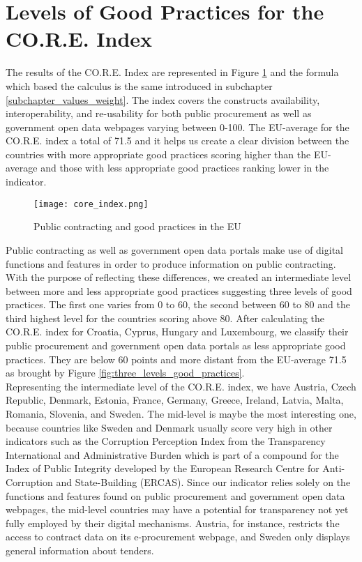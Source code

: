 \documentclass[a4paper, twoside]{report}
\begin{document}
\section{Levels of Good Practices for the CO.R.E. Index}
\label{core_index_eu}

The results of the CO.R.E. Index are represented in Figure \ref{fig:core_index} and the formula which based the calculus is the same introduced in subchapter \ref{subchapter_values_weight}. The index covers the constructs availability, interoperability, and re-usability for both public procurement as well as government open data webpages varying between 0-100. The EU-average for the CO.R.E. index a total of 71.5 and it helps us create a clear division between the countries with more appropriate good practices scoring higher than the EU-average and those with less appropriate good practices ranking lower in the indicator.\\

\begin{figure}[H]
\centering
	\caption{Public contracting and good practices in the EU}
	\texttt{[image: core\_index.png]}
	\label{fig:core_index}
\end{figure}


Public contracting as well as government open data portals make use of digital functions and features in order to produce information on public contracting. With the purpose of reflecting these differences, we created an intermediate level between more and less appropriate good practices suggesting three levels of good practices. The first one varies from 0 to 60, the second between 60 to 80 and the third highest level for the countries scoring above 80. After calculating the CO.R.E. index for Croatia, Cyprus, Hungary and Luxembourg, we classify their public procurement and government open data portals as less appropriate good practices. They are below 60 points and more distant from the EU-average 71.5 as brought by Figure \ref{fig:three_levels_good_practices}.\\

Representing the intermediate level of the CO.R.E. index, we have Austria, Czech Republic, Denmark, Estonia, France, Germany, Greece, Ireland, Latvia, Malta, Romania, Slovenia, and Sweden. The mid-level is maybe the most interesting one, because countries like Sweden and Denmark usually score very high in other indicators such as the Corruption Perception Index from the Transparency International and Administrative Burden which is part of a compound for the Index of Public Integrity developed by the European Research Centre for Anti-Corruption and State-Building (ERCAS). Since our indicator relies solely on the functions and features found on public procurement and government open data webpages, the mid-level countries may have a potential for transparency not yet fully employed by their digital mechanisms. Austria, for instance, restricts the access to contract data on its e-procurement webpage, and Sweden only displays general information about tenders.\\
\end{document}
